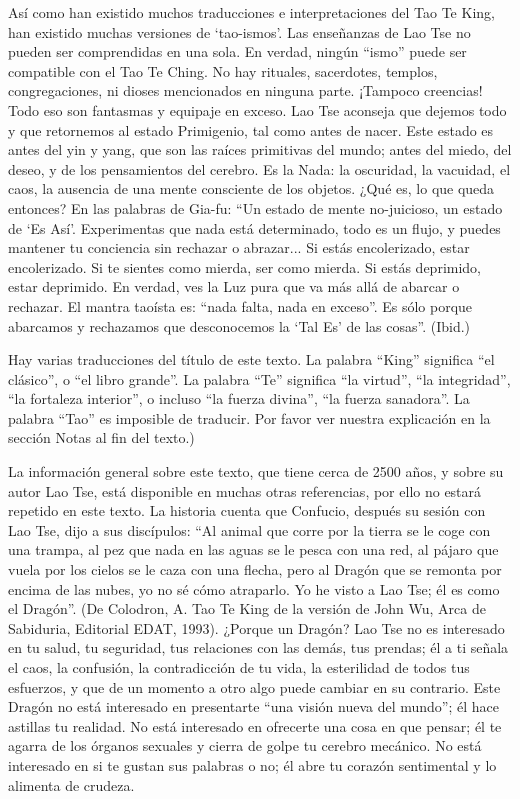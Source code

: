 \documentclass[book,b5paper,hidelinks,final]{memoir}
\begin{document}
	Así como han existido muchos traducciones e interpretaciones del Tao Te
	King, han existido muchas versiones de `tao-ismos'. Las enseñanzas de
	Lao Tse no pueden ser comprendidas en una sola. En verdad, ningún
	``ismo'' puede ser compatible con el Tao Te Ching. No hay rituales,
	sacerdotes, templos, congregaciones, ni dioses mencionados en ninguna
	parte. ¡Tampoco creencias! Todo eso son fantasmas y equipaje en exceso.
	Lao Tse aconseja que dejemos todo y que retornemos al estado Primigenio,
	tal como antes de nacer. Este estado es antes del yin y yang, que son
	las raíces primitivas del mundo; antes del miedo, del deseo, y de los
	pensamientos del cerebro. Es la Nada: la oscuridad, la vacuidad, el
	caos, la ausencia de una mente consciente de los objetos. ¿Qué es, lo
	que queda entonces? En las palabras de Gia-fu: ``Un estado de mente
	no-juicioso, un estado de `Es Así'. Experimentas que nada está
	determinado, todo es un flujo, y puedes mantener tu conciencia sin
	rechazar o abrazar... Si estás encolerizado, estar encolerizado. Si te
	sientes como mierda, ser como mierda. Si estás deprimido, estar
	deprimido. En verdad, ves la Luz pura que va más allá de abarcar o
	rechazar. El mantra taoísta es: ``nada falta, nada en exceso''. Es sólo
	porque abarcamos y rechazamos que desconocemos la `Tal Es' de las
	cosas''. (Ibid.)
	
	Hay varias traducciones del título de este texto. La palabra ``King''
	significa ``el clásico'', o ``el libro grande''. La palabra ``Te''
	significa ``la virtud'', ``la integridad'', ``la fortaleza interior'', o
	incluso ``la fuerza divina'', ``la fuerza sanadora''. La palabra ``Tao''
	es imposible de traducir. Por favor ver nuestra explicación en la
	sección Notas al fin del texto.)
	
	La información general sobre este texto, que tiene cerca de 2500 años, y
	sobre su autor Lao Tse, está disponible en muchas otras referencias, por
	ello no estará repetido en este texto. La historia cuenta que Confucio,
	después su sesión con Lao Tse, dijo a sus discípulos: ``Al animal que
	corre por la tierra se le coge con una trampa, al pez que nada en las
	aguas se le pesca con una red, al pájaro que vuela por los cielos se le
	caza con una flecha, pero al Dragón que se remonta por encima de las
	nubes, yo no sé cómo atraparlo. Yo he visto a Lao Tse; él es como el
	Dragón''. (De Colodron, A. Tao Te King de la versión de John Wu, Arca de
	Sabiduria, Editorial EDAT, 1993). ¿Porque un Dragón? Lao Tse no es
	interesado en tu salud, tu seguridad, tus relaciones con las demás, tus
	prendas; él a ti señala el caos, la confusión, la contradicción de tu
	vida, la esterilidad de todos tus esfuerzos, y que de un momento a otro
	algo puede cambiar en su contrario. Este Dragón no está interesado en
	presentarte ``una visión nueva del mundo''; él hace astillas tu
	realidad. No está interesado en ofrecerte una cosa en que pensar; él te
	agarra de los órganos sexuales y cierra de golpe tu cerebro mecánico. No
	está interesado en si te gustan sus palabras o no; él abre tu corazón
	sentimental y lo alimenta de crudeza.
	
\end{document}
